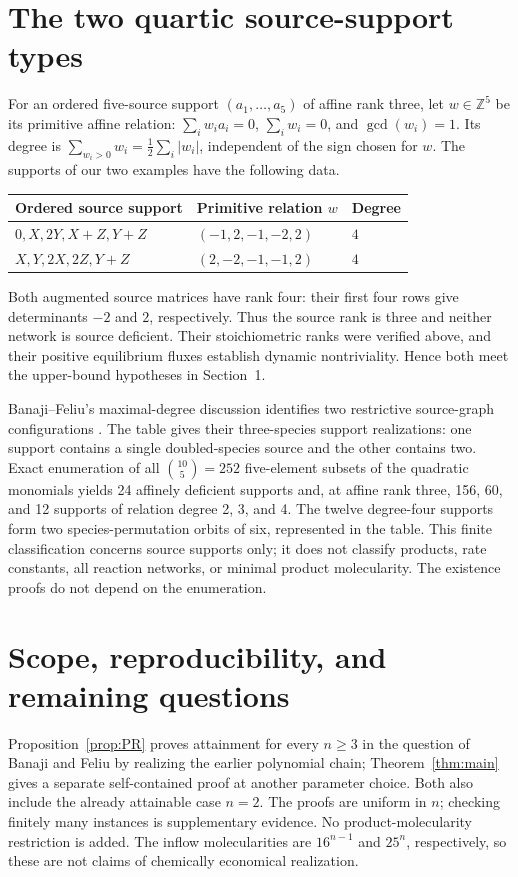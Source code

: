 \documentclass[11pt]{article}
\begin{document}
\section{The two quartic source-support types}\label{sec:supports}
For an ordered five-source support $(a_1,\ldots,a_5)$ of affine rank three, let $w\in\mathbb Z^5$ be its primitive affine relation: $\sum_iw_i a_i=0$, $\sum_iw_i=0$, and $\gcd(w_i)=1$. Its degree is $\sum_{w_i>0}w_i=\tfrac12\sum_i|w_i|$, independent of the sign chosen for $w$. The supports of our two examples have the following data.
\begin{center}
\begin{tabular}{@{}lll@{}}
\toprule
Ordered source support & Primitive relation $w$ & Degree\\
\midrule
$0,X,2Y,X+Z,Y+Z$ & $(-1,2,-1,-2,2)$ & $4$\\
$X,Y,2X,2Z,Y+Z$ & $(2,-2,-1,-1,2)$ & $4$\\
\bottomrule
\end{tabular}
\end{center}
Both augmented source matrices have rank four: their first four rows give determinants $-2$ and $2$, respectively. Thus the source rank is three and neither network is source deficient. Their stoichiometric ranks were verified above, and their positive equilibrium fluxes establish dynamic nontriviality. Hence both meet the upper-bound hypotheses in Section~1.

Banaji--Feliu's maximal-degree discussion identifies two restrictive source-graph configurations \cite[Remark 5.4(1) and Remark 5.7]{BF}. The table gives their three-species support realizations: one support contains a single doubled-species source and the other contains two. Exact enumeration of all $\binom{10}{5}=252$ five-element subsets of the quadratic monomials yields 24 affinely deficient supports and, at affine rank three, 156, 60, and 12 supports of relation degree 2, 3, and 4. The twelve degree-four supports form two species-permutation orbits of six, represented in the table. This finite classification concerns source supports only; it does not classify products, rate constants, all reaction networks, or minimal product molecularity. The existence proofs do not depend on the enumeration.

\section{Scope, reproducibility, and remaining questions}
Proposition~\ref{prop:PR} proves attainment for every $n\geq3$ in the question of Banaji and Feliu by realizing the earlier polynomial chain; Theorem~\ref{thm:main} gives a separate self-contained proof at another parameter choice. Both also include the already attainable case $n=2$. The proofs are uniform in $n$; checking finitely many instances is supplementary evidence. No product-molecularity restriction is added. The inflow molecularities are $16^{n-1}$ and $25^n$, respectively, so these are not claims of chemically economical realization.
\end{document}
